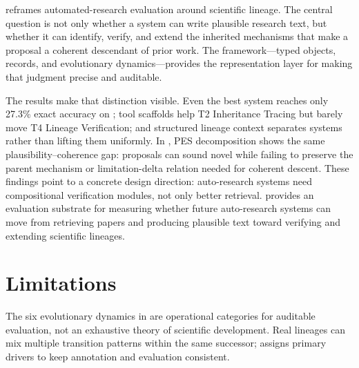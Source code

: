 \gene{} reframes automated-research evaluation around scientific lineage. The central question is not only whether a system can write plausible research text, but whether it can identify, verify, and extend the inherited mechanisms that make a proposal a coherent descendant of prior work. The \ideagene{} framework---typed \genome{} objects, \genomediff{} records, and evolutionary dynamics---provides the representation layer for making that judgment precise and auditable.

The results make that distinction visible. Even the best system reaches only 27.3\% exact accuracy on \geneexam{}; tool scaffolds help T2 Inheritance Tracing but barely move T4 Lineage Verification; and structured lineage context separates systems rather than lifting them uniformly. In \genearena{}, PES decomposition shows the same plausibility--coherence gap: proposals can sound novel while failing to preserve the parent mechanism or limitation-delta relation needed for coherent descent. These findings point to a concrete design direction: auto-research systems need compositional verification modules, not only better retrieval. \gene{} provides an evaluation substrate for measuring whether future auto-research systems can move from retrieving papers and producing plausible text toward verifying and extending scientific lineages.

\section{Limitations}
The six evolutionary dynamics in \gene{} are operational categories for auditable evaluation, not an exhaustive theory of scientific development. Real lineages can mix multiple transition patterns within the same successor; \gene{} assigns primary drivers to keep annotation and evaluation consistent.
